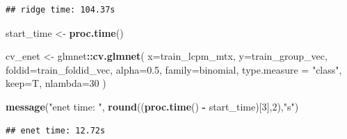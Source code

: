 \documentclass[
]{book}
\newenvironment{Shaded}{\begin{snugshade}}{\end{snugshade}}
\newcommand{\DataTypeTok}[1]{\textcolor[rgb]{0.13,0.29,0.53}{#1}}
\newcommand{\DecValTok}[1]{\textcolor[rgb]{0.00,0.00,0.81}{#1}}
\newcommand{\FloatTok}[1]{\textcolor[rgb]{0.00,0.00,0.81}{#1}}
\newcommand{\KeywordTok}[1]{\textcolor[rgb]{0.13,0.29,0.53}{\textbf{#1}}}
\newcommand{\NormalTok}[1]{#1}
\newcommand{\OperatorTok}[1]{\textcolor[rgb]{0.81,0.36,0.00}{\textbf{#1}}}
\newcommand{\StringTok}[1]{\textcolor[rgb]{0.31,0.60,0.02}{#1}}
\begin{document}
\begin{verbatim}
## ridge time: 104.37s
\end{verbatim}

\begin{Shaded}
\begin{Highlighting}[]
\NormalTok{start\_time <{-}}\StringTok{  }\KeywordTok{proc.time}\NormalTok{()}

\NormalTok{cv\_enet <{-}}\StringTok{ }\NormalTok{glmnet}\OperatorTok{::}\KeywordTok{cv.glmnet}\NormalTok{(}
 \DataTypeTok{x=}\NormalTok{train\_lcpm\_mtx,}
 \DataTypeTok{y=}\NormalTok{train\_group\_vec,}
 \DataTypeTok{foldid=}\NormalTok{train\_foldid\_vec,}
 \DataTypeTok{alpha=}\FloatTok{0.5}\NormalTok{,}
 \DataTypeTok{family=}\StringTok{\textquotesingle{}binomial\textquotesingle{}}\NormalTok{,}
 \DataTypeTok{type.measure =} \StringTok{"class"}\NormalTok{,}
 \DataTypeTok{keep=}\NormalTok{T,}
 \DataTypeTok{nlambda=}\DecValTok{30}
\NormalTok{)}

\KeywordTok{message}\NormalTok{(}\StringTok{"enet time: "}\NormalTok{, }\KeywordTok{round}\NormalTok{((}\KeywordTok{proc.time}\NormalTok{() }\OperatorTok{{-}}\StringTok{ }\NormalTok{start\_time)[}\DecValTok{3}\NormalTok{],}\DecValTok{2}\NormalTok{),}\StringTok{"s"}\NormalTok{)}
\end{Highlighting}
\end{Shaded}

\begin{verbatim}
## enet time: 12.72s
\end{verbatim}
\end{document}
